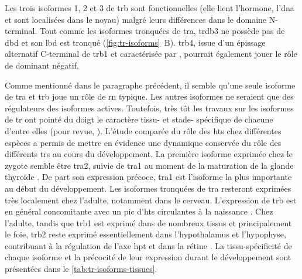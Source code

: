 \documentclass[../main.tex]{subfiles}
\begin{document}
		Les trois isoformes 1, 2 et 3 de \gls{trb} sont fonctionnelles (elle lient l'hormone, l'\gls{dna} et sont localisées dans le noyau) malgré leurs différences dans le domaine N-terminal.
		Tout comme les isoformes tronquées de \gls{tra}, \gls{trdb}3 ne possède pas de \gls{dbd} et son \gls{lbd} est tronqué (\autoref{fig:tr-isoforms}~B).
		\gls{trb}4, issue d'un épissage alternatif C-terminal de \gls{trb}1 et caractérisée par \citet{Tagami2010}, pourrait également jouer le rôle de dominant négatif.
		\par
		Comme mentionné dans le paragraphe précédent, il semble qu'une seule isoforme de \gls{tra} et \gls{trb} joue un rôle de \gls{rn} typique.
		Les autres isoformes ne seraient que des régulateurs des isoformes actives.
		Toutefois, très tôt les travaux sur les isoformes de \gls{tr} ont pointé du doigt le caractère tissu- et stade- spécifique de chacune d'entre elles (pour revue, \citealp{Flamant2003,Cheng2010}).
		L'étude comparée du rôle des \glspl{ht} chez différentes espèces a permis de mettre en évidence une dynamique conservée du rôle des différents \glspl{tr} au cours du développement.
		La première isoforme exprimée chez le zygote semble être \gls{tra}2, suivie de \gls{tra}1 au moment de la maturation de la glande thyroïde \citep{Strait1991}.
		De part son expression précoce, \gls{tra}1 est l'isoforme la plus importante au début du développement.
		Les isoformes tronquées de \gls{tra} resteront exprimées très localement chez l'adulte, notamment dans le cerveau.
		L'expression de \gls{trb} est en général concomitante avec un pic d'\glspl{ht} circulantes à la naissance \citep{Keijzer2007}.
		Chez l'adulte, tandis que \gls{trb}1 est exprimé dans de nombreux tissus et principalement le foie, \gls{trb}2 reste exprimé essentiellement dans l'hypothalamus et l'hypophyse, contribuant à la régulation de l'axe \gls{hpt} \citep{Schwartz1994} et dans la rétine \citep{Abel1999}.
		La tissu-spécificité de chaque isoforme et la précocité de leur expression durant le développement sont présentées dans le \autoref{tab:tr-isoforms-tissues}.

		

\end{document}
